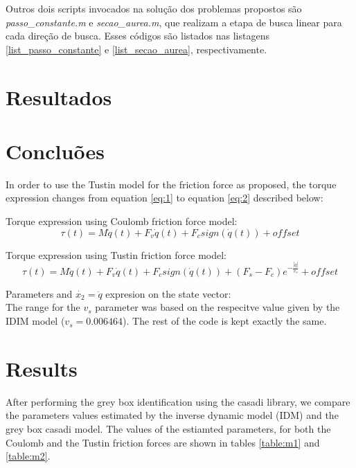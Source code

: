 \documentclass[10pt, a4paper]{article}
\begin{document}
Outros dois scripts invocados na solu\c c\~ao dos problemas propostos s\~ao \textit{passo\_constante.m} e \textit{secao\_aurea.m}, que realizam a etapa de busca linear para cada dire\c c\~ao de busca. Esses c\'odigos s\~ao listados nas listagens \ref{list_passo_constante} e \ref{list_secao_aurea}, respectivamente.

\section{Resultados}

\section{Conclu\~oes}

In order to use the Tustin model for the friction force as proposed, the torque expression changes from equation \ref{eq:1} to equation \ref{eq:2} described below:     \newline


Torque expression using Coulomb friction force model:
\begin{equation}\label{eq:1}
      \tau(t) = M\ddot{q}(t) + F_{v}\dot{q}(t) + F_{c}sign(\dot{q}(t)) + offset
\end{equation}

Torque expression using Tustin friction force model:
\begin{equation}\label{eq:2}
      \tau(t) = M\ddot{q}(t) + F_{v}\dot{q}(t) + F_{c}sign(\dot{q}(t)) + (F_{s} - F_{c})e^{-\frac{|\dot{q}|}{v_{s}}} + offset
\end{equation}


Parameters and $\dot{x_{2}}=\ddot{q}$ expresion on the state vector: \\

The range for the $v_{s}$ parameter was based on the respecitve value given by the IDIM model ($v_{s} = 0.006464$). The rest of the code is kept exactly the same.

\section{Results}

After performing the grey box identification using the casadi library, we compare the parameters values estimated by the inverse dynamic model (IDM) and the grey box casadi model. The values of the estiamted parameters, for both the Coulomb and the Tustin friction forces are shown in tables \ref{table:m1} and \ref{table:m2}.
\end{document}
